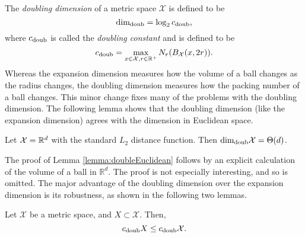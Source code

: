 \documentclass[../main.tex]{subfiles}
\newcommand{\set}[1]{\mathcal {#1}}
\newcommand{\radius}{r}
\newcommand{\minkdim}{\text{dim}_\textnormal{Mink}}
\newcommand{\doubdim}{\text{dim}_\textnormal{doub}}
\newcommand{\cdoub}{c_\textnormal{doub}}
\begin{document}
%

%

The \emph{doubling dimension} of a metric space $\set X$ is defined to be
\begin{equation}
    \doubdim = \log_2 \cdoub
    ,
\end{equation}
where $\cdoub$ is called the \emph{doubling constant} and is defined to be
\begin{equation}
    \cdoub = \max_{x\in\set X, \radius\in\R^+} N_\radius(B_{\set X}(x,2\radius))
    .
\end{equation}
Whereas the expansion dimension measures how the volume of a ball changes as the radius changes,
the doubling dimension measures how the packing number of a ball changes.
This minor change fixes many of the problems with the doubling dimension.
The following lemma shows that the doubling dimension (like the expansion dimension) agrees with the dimension in Euclidean space.
\begin{lemma}
    \label{lemma:doubleEuclidean}
    Let $\set X=\R^d$ with the standard $L_2$ distance function.
    Then $\doubdim\set X=\Theta(d)$.
\end{lemma}
\noindent
The proof of Lemma \ref{lemma:doubleEuclidean} follows by an explicit calculation of the volume of a ball in $\mathbb{R}^d$.
The proof is not especially interesting, and so is omitted.
The major advantage of the doubling dimension over the expansion dimension is its robustness,
as shown in the following two lemmas.


\begin{lemma}
    Let $\set X$ be a metric space, and $X\subset\set X$.
    Then,
    \begin{equation}
        \label{eq:cdoubinclusion}
        \cdoub X \le \cdoub \set X.
    \end{equation}
\end{lemma}
\end{document}
